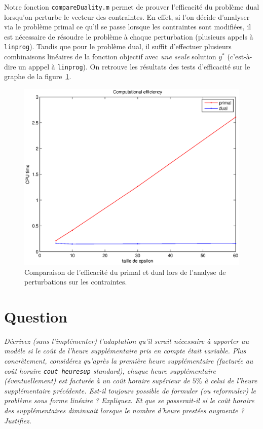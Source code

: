 \documentclass[12pt,oneside,a4paper]{article}
\newcommand{\question}
{
\addtocounter{section}{1}
\section*{Question \thesection}
}
\begin{document}
Notre fonction \texttt{compareDuality.m} permet de prouver l'efficacité
du problème dual lorsqu'on perturbe le vecteur des contraintes.
En effet, si l'on décide d'analyser via le problème primal ce qu'il 
se passe lorsque les contraintes sont modifiées, il est nécessaire de 
résoudre le problème à chaque perturbation 
(plusieurs appels à \texttt{linprog}).
Tandis que pour le problème dual,
il suffit d'effectuer plusieurs combinaisons linéaires de la fonction objectif
avec \emph{une seule} solution $y^{*}$ 
(c'est-à-dire un apppel à \texttt{linprog}).
On retrouve les résultats des tests d'efficacité
sur le graphe de la figure~\ref{fig:efficiencyDual}.
\begin{figure}
  \begin{center}
    \includegraphics[scale=0.7]{img/efficiencyDual.eps}
    \caption{Comparaison de l'efficacité du primal et dual lors de
    l'analyse de perturbations sur les contraintes.}
    \label{fig:efficiencyDual}
  \end{center}
\end{figure}

\question %
\emph{Décrivez (sans l'implémenter) l'adaptation qu'il serait nécessaire à
apporter au modèle si le coût de l'heure supplémentaire pris en compte était
variable. Plus concrètement, considérez qu'après la première heure
supplémentaire (facturée au coût horaire \texttt{cout\textunderscore
heure\textunderscore sup} standard), chaque heure supplémentaire
(éventuellement) est facturée à un coût horaire supérieur de $5 \%$ 
à celui de l'heure supplémentaire précédente. 
Est-il toujours possible de formuler (ou reformuler) 
le problème sous forme linéaire ? Expliquez. 
Et que se passerait-il si le coût horaire des supplémentaires \emph{diminuait}
lorsque le nombre d'heure prestées augmente ? Justifiez.}
\end{document}
